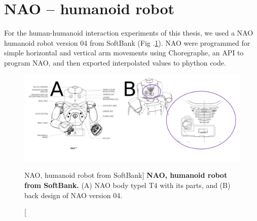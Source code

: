 \section{NAO -- humanoid robot}  \label{appendix:nao}
For the human-humanoid interaction experiments of this thesis, 
we used a NAO humanoid robot version 04 from SoftBank (Fig .\ref{fig:nao}).
NAO were programmed for simple horizontal and vertical arm movements
using Choregraphe, an API to program NAO, and then exported interpolated 
values to phython code.
\begin{figure}
 \centering
   \includegraphics[width=1.0\textwidth]{nao}
   \caption
	[NAO, humanoid robot from SoftBank]{
	{\bf NAO, humanoid robot from SoftBank.}
		(A) NAO body typel T4 with its parts, and 
		(B) back design of NAO version 04.
}
   \label{fig:nao}
\end{figure}








